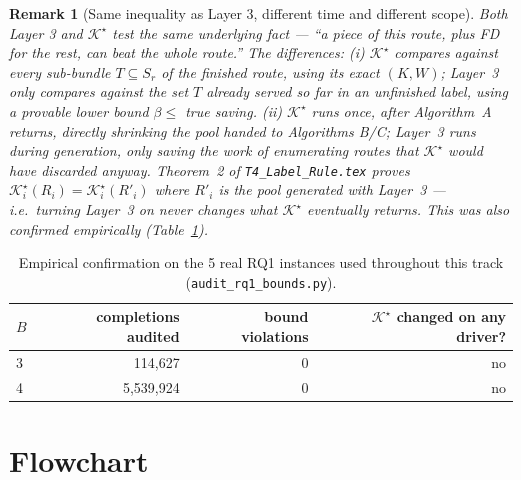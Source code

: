 \documentclass[11pt]{article}
\newtheorem{remark}{Remark}
\newcommand{\Ks}{\mathcal{K}^{\star}}
\begin{document}
\begin{remark}[Same inequality as Layer 3, different time and different scope]
Both Layer 3 and $\Ks$ test the same underlying fact --- ``a piece of this route, plus FD for
the rest, can beat the whole route.'' The differences: (i) $\Ks$ compares against \emph{every}
sub-bundle $T\subseteq S_r$ of the \emph{finished} route, using its \emph{exact} $(K,W)$;
Layer~3 only compares against the set $T$ \emph{already served so far} in an \emph{unfinished}
label, using a provable \emph{lower bound} $\beta\le$ true saving. (ii) $\Ks$ runs once, after
Algorithm~A returns, directly shrinking the pool handed to Algorithms B/C; Layer~3 runs
\emph{during} generation, only saving the work of enumerating routes that $\Ks$ would have
discarded anyway. Theorem~2 of \texttt{T4\_Label\_Rule.tex} proves
$\Ks_i(R_i)=\Ks_i(R'_i)$ where $R'_i$ is the pool generated \emph{with} Layer~3 --- i.e.\
turning Layer~3 on never changes what $\Ks$ eventually returns. This was also confirmed
empirically (Table~\ref{tab:audit}).
\end{remark}

\begin{table}[h]
\centering
\begin{tabular}{@{}lrrr@{}}
\toprule
$B$ & completions audited & bound violations & $\Ks$ changed on any driver? \\
\midrule
3 & 114{,}627 & 0 & no \\
4 & 5{,}539{,}924 & 0 & no \\
\bottomrule
\end{tabular}
\caption{Empirical confirmation on the 5 real RQ1 instances used throughout this track
(\texttt{audit\_rq1\_bounds.py}).}
\label{tab:audit}
\end{table}

\section{Flowchart}
\end{document}
